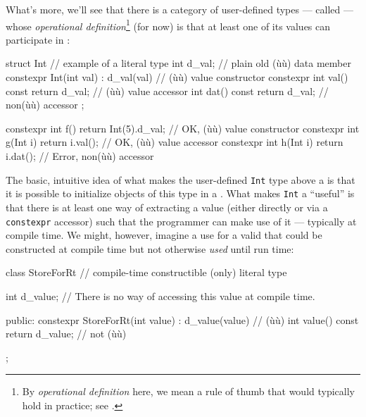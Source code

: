 What's more, we'll see that there is a category of user-defined types
--- called  --- whose \emph{operational
definition}{\cprotect\footnote{By \emph{operational definition} here, we
mean a rule of thumb that would typically hold in practice; see
.}} (for now) is that at
least one of its values can participate in :

\begin{emcppslisting}
struct Int  // example of a literal type
{
    int d_val;                                   // plain old (ù{}ù) data member
    constexpr Int(int val) : d_val(val) { }      // (ù{}ù) value constructor
    constexpr int val() const { return d_val; }  // (ù{}ù) value accessor
              int dat() const { return d_val; }  // non(ù{}ù) accessor
};

constexpr int f(){ return Int(5).d_val; }  // OK, (ù{}ù) value constructor
constexpr int g(Int i){ return i.val(); }  // OK, (ù{}ù) value accessor
constexpr int h(Int i){ return i.dat(); }  // Error, non(ù{}ù) accessor
\end{emcppslisting}


\noindent The basic, intuitive idea of what makes the user-defined \lstinline!Int!
type above a  is that it is possible to initialize
objects of this type in a . What makes
\lstinline!Int! a ``useful''  is that there is at
least one way of extracting a value (either directly or via a
\lstinline!constexpr! accessor) such that the programmer can make use of it
--- typically at compile time. We might, however, imagine a use for a
valid  that could be constructed at compile time
but not otherwise \emph{used} until run time:

\begin{emcppslisting}[emcppsbatch=e4]
class StoreForRt   // compile-time constructible (only) literal type
{
    int d_value;   // There is no way of accessing this value at compile time.

public:
    constexpr StoreForRt(int value) : d_value(value) { }  //       (ù{}ù)
    int value() const { return d_value; }                 // not (ù{}ù)
};
\end{emcppslisting}


